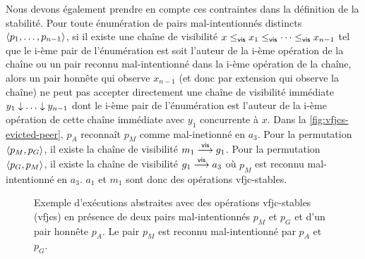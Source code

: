 Nous devons également prendre en compte ces contraintes dans la définition de la stabilité.
Pour toute énumération de pairs mal-intentionnés distincts $\tuple*{p_1, \dotsc ,p_{n-1}}$, si il existe une chaîne de visibilité $x \viseq x_1 \viseq \dotsb \viseq x_{n-1}$ tel que le i-ème pair de l'énumération est soit l'auteur de la i-ème opération de la chaîne ou un pair reconnu mal-intentionné dans la i-ème opération de la chaîne, alors un pair honnête qui observe $x_{n-1}$ (et donc par extension qui observe la chaîne) ne peut pas accepter directement une chaîne de visibilité immédiate $y_1 \idr \dotsc \idr y_{n-1}$ dont le i-ème pair de l'énumération est l'auteur de la i-ème opération de cette chaîne immédiate avec $y_1$ concurrente à $x$.
Dans la \autoref{fig:vfjcs-evicted-peer}, $p_A$ reconnaît $p_M$ comme mal-inetionné en $a_3$.
Pour la permutation $\tuple*{p_M, p_G}$, il existe la chaîne de visibilité $m_1 \vis g_1$.
Pour la permutation $\tuple*{p_G, p_M}$, il existe la chaîne de visibilité $g_1 \vis a_3$ où $p_M$ est reconnu mal-intentionné en $a_3$.
$a_1$ et $m_1$ sont donc des opérations vfjc-stables.

\begin{figure}[htb]
\centering
{}
\caption{Exemple d'exécutions abstraites avec des opérations vfjc-stables (vfjcs) en présence de deux pairs mal-intentionnés $p_M$ et $p_G$ et d'un pair honnête $p_A$.
Le pair $p_M$ est reconnu mal-intentionné par $p_A$ et $p_G$.}\label{fig:vfjcs-evicted-peer}
\end{figure}


